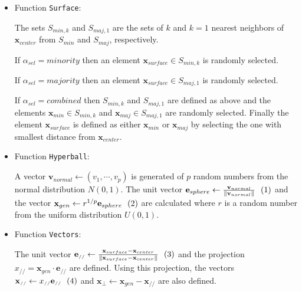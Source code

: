 \documentclass[parskip=full]{scrartcl}
\newcommand{\inlineeqnum}{\refstepcounter{equation}~~\mbox{(\theequation)}}
\begin{document}
\begin{itemize}
	
	\renewcommand\labelitemi{--}
	
	\item Function \texttt{Surface}:
	
		The sets  \( S_{min, k} \) and \( S_{maj, 1} \) are the sets of \( k \)
		and \( k = 1 \) nearest neighbors of \( \textbf{x}_{center} \) from \(
		S_{min} \) and \( S_{maj} \), respectively.
	
		If \( \alpha_{sel} = minority \) then an element \( \textbf{x}_{surface}
		\in S_{min, k}\) is randomly selected.
			
		If \( \alpha_{sel} = majority \) then an element \( \textbf{x}_{surface}
		\in S_{maj, 1}\) is randomly selected.
			
		If \( \alpha_{sel} = combined \) then \( S_{min, k} \) and \( S_{maj, 1}
		\) are defined as above and the elements \( \textbf{x}_{min} \in S_{min,
		k}\) and  \( \textbf{x}_{maj} \in S_{maj, 1}\) are randomly selected.
		Finally the element \( \textbf{x}_{surface} \) is defined as either \(
		\textbf{x}_{min} \) or \( \textbf{x}_{maj} \) by selecting the one with
		smallest distance from \( \textbf{x}_{center} \).
			
	
	\item Function \texttt{Hyperball}:
		
		A vector \( \textbf{v}_{normal} \leftarrow (v_{1}, \cdots, v_{p}) \) is
		generated of \( p \) random numbers from the normal distribution \( N(0,
		1) \). The unit vector \( \textbf{e}_{sphere} \leftarrow
		\frac{\textbf{v}_{normal}}{ \|\textbf{v}_{normal} \|}
		\inlineeqnum\label{eqn:sphere} \) and the vector \( \textbf{x}_{gen}
		\leftarrow r^{1 / p} \textbf{e}_{sphere} \inlineeqnum\label{eqn:ball} \)
		are calculated where \( r \) is a random number from the uniform
		distribution \( U(0, 1) \).
			
	\item Function \texttt{Vectors}:
	
		The unit vector \( \textbf{e}_{\scriptscriptstyle//} \leftarrow
		\frac{\textbf{x}_{surface} - \textbf{x}_{center}}{
		\|\textbf{x}_{surface} - \textbf{x}_{center} \|}
		\inlineeqnum\label{eqn:unit} \) and the projection  \(
		x_{\scriptscriptstyle//} = \textbf{x}_{gen} \cdot
		\textbf{e}_{\scriptscriptstyle//} \)  are defined. Using this
		projection, the vectors \( \textbf{x}_{\scriptscriptstyle//} \leftarrow
		x_{\scriptscriptstyle//} \textbf{e}_{\scriptscriptstyle//}
		\inlineeqnum\label{eqn:parallel} \) and \( \textbf{x}_{\bot} \leftarrow
		\textbf{x}_{gen} - \textbf{x}_{\scriptscriptstyle//} \) are also
		defined.
	 		

\end{itemize}
\end{document}
